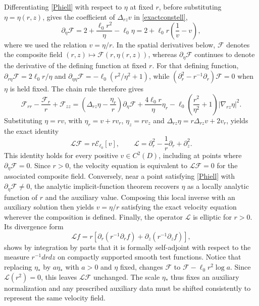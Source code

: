\documentclass[amsmath,amsfonts,amssymb,aps,pra,superscriptaddress,10pt]{revtex4-2}
\numberwithin{equation}{section}
\theoremstyle{plain}
\theoremstyle{definition}
\theoremstyle{remark}
\theoremstyle{definition}
\newcommand{\ellzero}{\ell_0}
\newcommand{\Drz}{\Delta_{rz}}
\newcommand{\gradRZ}{\nabla_{rz}}
\newcommand{\EE}{\mathcal E_{\ellzero}}
\begin{document}
Differentiating \eqref{Phiell} with respect to $\eta$ at fixed $r$, before substituting $\eta=\eta(r,z)$, gives the coefficient of $\Drz v$ in \eqref{exactconstell},
\begin{equation}\label{coeffA}
\partial_\eta\mathcal{F}=2+\frac{\ellzero r^2}{\eta}-\ellzero\eta=2+\ellzero r\left(\frac{1}{v}-v\right),
\end{equation}
where we used the relation $v=\eta/r$. In the spatial derivatives below, $\mathcal{F}$ denotes the composite field $(r,z)\mapsto\mathcal{F}(r,\eta(r,z))$, whereas $\partial_\eta\mathcal{F}$ continues to denote the derivative of the defining function at fixed $r$. For that defining function, $\partial_{r\eta}\mathcal{F}=2\ellzero r/\eta$ and $\partial_{\eta\eta}\mathcal{F}=-\ellzero(r^2/\eta^2+1)$, while $(\partial_r^2-r^{-1}\partial_r)\mathcal{F}=0$ when $\eta$ is held fixed. The chain rule therefore gives
\begin{equation}
\mathcal{F}_{rr}-\frac{\mathcal{F}_r}{r}+\mathcal{F}_{zz}=\left(\Drz\eta-\frac{\eta_r}{r}\right)\partial_\eta\mathcal{F}+\frac{4\ellzero r}{\eta}\eta_r-\ellzero\left(\frac{r^2}{\eta^2}+1\right)|\gradRZ\eta|^2.
\end{equation}
Substituting $\eta=rv$, with $\eta_r=v+rv_r$, $\eta_z=rv_z$ and $\Drz\eta=r\Drz v+2v_r$, yields the exact identity
\begin{equation}\label{elinident}
\mathcal{L}\mathcal{F}=r\EE[v],\qquad
\mathcal{L}=\partial_r^2-\frac{1}{r}\partial_r+\partial_z^2.
\end{equation}
This identity holds for every positive $v\in C^2(D)$, including at points where $\partial_\eta\mathcal{F}=0$. Since $r>0$, the velocity equation is equivalent to $\mathcal{L}\mathcal{F}=0$ for the associated composite field. Conversely, near a point satisfying \eqref{Phiell} with $\partial_\eta\mathcal{F}\neq 0$, the analytic implicit-function theorem recovers $\eta$ as a locally analytic function of $r$ and the auxiliary value. Composing this local inverse with an auxiliary solution then yields $v=\eta/r$ satisfying the exact velocity equation wherever the composition is defined. Finally, the operator $\mathcal{L}$ is elliptic for $r>0$. Its divergence form
\begin{equation}
\mathcal{L} f
=r\left[\partial_r\left(r^{-1}\partial_r f\right)+\partial_z\left(r^{-1}\partial_z f\right)\right],
\end{equation}
shows by integration by parts that it is formally self-adjoint with respect to the measure $r^{-1}drdz$ on compactly supported smooth test functions. Notice that replacing $\eta_*$ by $a\eta_*$ with $a>0$ and $\eta$ fixed, changes $\mathcal{F}$ to $\mathcal{F}-\ellzero r^2\log{a}$. Since $\mathcal{L}(r^2)=0$, this leaves $\mathcal{L}\mathcal{F}$ unchanged. The scale $\eta_*$ thus fixes an auxiliary normalization and any prescribed auxiliary data must be shifted consistently to represent the same velocity field.
\end{document}
